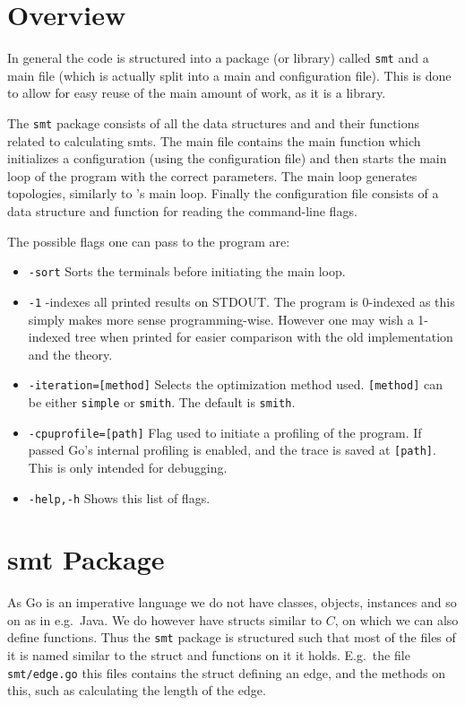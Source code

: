 \section{Overview}
\label{sec:overview-1}

In general the code is structured into a package (or library) called
\texttt{smt} and a main file (which is actually split into a main and
configuration file). This is done to allow for easy reuse of the main amount of
work, as it is a library.

The \texttt{smt} package consists of all the data structures and and their
functions related to calculating \acp{smt}. The main file contains the main
function which initializes a configuration (using the configuration file) and
then starts the main loop of the program with the correct parameters. The main
loop generates topologies, similarly to \citeauthor{smith1992}'s main loop.
Finally the configuration file consists of a data structure and function for
reading the command-line flags.

The possible flags one can pass to the program are:
\begin{itemize}
\item \texttt{-sort} \quad Sorts the terminals before initiating the main loop.
\item \texttt{-1} -indexes all printed results on STDOUT. The program is
  0-indexed as this simply makes more sense programming-wise. However one may
  wish a 1-indexed tree when printed for easier comparison with the old
  implementation and the theory.
\item \texttt{-iteration=[method]} \quad Selects the optimization method used.
  \texttt{[method]} can be either \texttt{simple} or \texttt{smith}. The default
  is \texttt{smith}.
\item \texttt{-cpuprofile=[path]} \quad Flag used to initiate a profiling of the
  program. If passed Go's internal profiling is enabled, and the trace is saved
  at \texttt{[path]}. This is only intended for debugging.
\item \texttt{-help,-h} \quad Shows this list of flags. 
\end{itemize}

\section{\acs{smt} Package}
\label{sec:smt-package}

As Go is an imperative language we do not have classes, objects, instances and
so on as in e.g.\ Java. We do however have structs similar to $C$, on which we
can also define functions. Thus the \texttt{smt} package is structured such that
most of the files of it is named similar to the struct and functions on it it
holds. E.g.\ the file \texttt{smt/edge.go} this files contains the struct
defining an edge, and the methods on this, such as calculating the length of the
edge.

